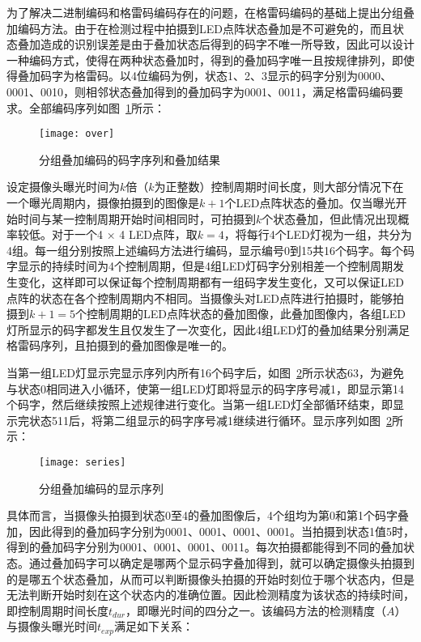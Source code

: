 为了解决二进制编码和格雷码编码存在的问题，在格雷码编码的基础上提出分组叠加编码方法。由于在检测过程中拍摄到LED点阵状态叠加是不可避免的，而且状态叠加造成的识别误差是由于叠加状态后得到的码字不唯一所导致，因此可以设计一种编码方式，使得在两种状态叠加时，得到的叠加码字唯一且按规律排列，即使得叠加码字为格雷码。以4位编码为例，状态1、2、3显示的码字分别为0000、0001、0010，则相邻状态叠加得到的叠加码字为0001、0011，满足格雷码编码要求。全部编码序列如图~\ref{over}所示：

\begin{figure}[h] 
  \centering
  \texttt{[image: over]}
  \caption{分组叠加编码的码字序列和叠加结果}
  \label{over}
\end{figure}

设定摄像头曝光时间为$k$倍（$k$为正整数）控制周期时间长度，则大部分情况下在一个曝光周期内，摄像拍摄到的图像是$k + 1$个LED点阵状态的叠加。仅当曝光开始时间与某一控制周期开始时间相同时，可拍摄到$k$个状态叠加，但此情况出现概率较低。对于一个4 × 4 LED点阵，取$k = 4$，将每行4个LED灯视为一组，共分为4组。每一组分别按照上述编码方法进行编码，显示编号0到15共16个码字。每个码字显示的持续时间为4个控制周期，但是4组LED灯码字分别相差一个控制周期发生变化，这样即可以保证每个控制周期都有一组码字发生变化，又可以保证LED点阵的状态在各个控制周期内不相同。当摄像头对LED点阵进行拍摄时，能够拍摄到$k + 1 = 5$个控制周期的LED点阵状态的叠加图像，此叠加图像内，各组LED灯所显示的码字都发生且仅发生了一次变化，因此4组LED灯的叠加结果分别满足格雷码序列，且拍摄到的叠加图像是唯一的。

当第一组LED灯显示完显示序列内所有16个码字后，如图~\ref{series}所示状态63，为避免与状态0相同进入小循环，使第一组LED灯即将显示的码字序号减1，即显示第14个码字，然后继续按照上述规律进行变化。当第一组LED灯全部循环结束，即显示完状态511后，将第二组显示的码字序号减1继续进行循环。显示序列如图~\ref{series}所示：

\begin{figure}[h] 
  \centering
  \texttt{[image: series]}
  \caption{分组叠加编码的显示序列}
  \label{series}
\end{figure}

具体而言，当摄像头拍摄到状态0至4的叠加图像后，4个组均为第0和第1个码字叠加，因此得到的叠加码字分别为0001、0001、0001、0001。当拍摄到状态1值5时，得到的叠加码字分别为0001、0001、0001、0011。每次拍摄都能得到不同的叠加状态。通过叠加码字可以确定是哪两个显示码字叠加得到，就可以确定摄像头拍摄到的是哪五个状态叠加，从而可以判断摄像头拍摄的开始时刻位于哪个状态内，但是无法判断开始时刻在这个状态内的准确位置。因此检测精度为该状态的持续时间，即控制周期时间长度$t_{dur}$，即曝光时间的四分之一。该编码方法的检测精度（$A$）与摄像头曝光时间$t_{exp}$满足如下关系：

